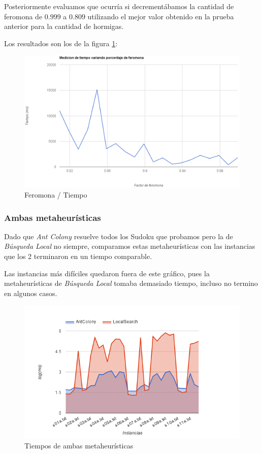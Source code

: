 \documentclass[a4paper,spanish]{article}
\begin{document}
Posteriormente evaluamos que ocurría si decrementábamos la cantidad de feromona de $0.999$ a
$0.809$ utilizando el mejor valor obtenido en la prueba anterior para la cantidad de hormigas.

Los resultados son los de la figura \ref{img:feromon_ant}:

\begin{figure}[h]
	\centering
	\includegraphics[scale=0.45]{./img/feromona_tiempo.png}
	\caption{Feromona / Tiempo}
	\label{img:feromon_ant}
\end{figure}

\clearpage

\subsubsection{Ambas metaheurísticas}

Dado que \emph{Ant Colony} resuelve todos los Sudoku que probamos pero la
de \emph{Búsqueda Local} no siempre, comparamos estas metaheurísticas con las
instancias que los 2 terminaron en un tiempo comparable.

Las instancias más difíciles quedaron fuera de este gráfico, pues la
metaheurísticas de \emph{Búsqueda Local} tomaba demasiado tiempo, incluso
no termino en algunos casos.

\begin{figure}[h]
	\centering
	\includegraphics[scale=0.6]{./graficos/tiemposAmbasMetaheuristicas.png}
	\caption{Tiempos de ambas metaheurísticas}
	\label{img:times}
\end{figure}
\end{document}
